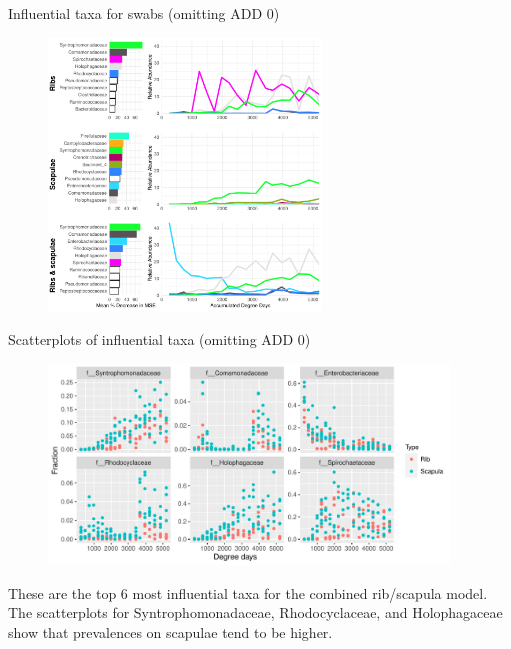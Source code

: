\documentclass{beamer}
\begin{document}
\begin{frame}{Influential taxa for swabs (omitting ADD 0)}

  \begin{center}
    \begin{figure}
      \includegraphics[height=2.85in]
        {w_bones/bacteria/use_families/hl_combined_family_no_baseline_6panels}
    \end{figure}
  \end{center}

\end{frame}



\begin{frame}{Scatterplots of influential taxa (omitting ADD 0)}

  \begin{center}
    \begin{figure}
      \includegraphics[height=2.1in]
        {w_bones/bacteria/use_families/both_ribs_scapulae/no_baseline/infl_combined_bone_no_baseline_family_scatter}
    \end{figure}
  \end{center}

  \vspace{0.1in}

  \footnotesize{ \noindent These are the top 6 most influential taxa for the
    combined rib/scapula model.  The scatterplots for Syntrophomonadaceae,
    Rhodocyclaceae, and Holophagaceae show that prevalences on scapulae tend to
    be higher.
    }

\end{frame}
\end{document}
